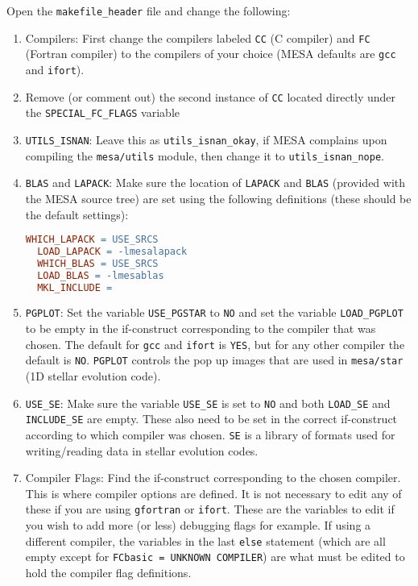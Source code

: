 Open the {\tt makefile\_header} file and change the following:
\begin{enumerate}
\item Compilers: First change the compilers labeled {\tt CC} (C compiler) 
and {\tt FC} (Fortran compiler) to the compilers of your choice ({\sf MESA} 
defaults are {\tt gcc} and {\tt ifort}).

\item Remove (or comment out) the second instance of {\tt CC} located 
directly under the {\tt SPECIAL\_FC\_FLAGS} variable

\item {\tt UTILS\_ISNAN}: Leave this as {\tt utils\_isnan\_okay}, if {\sf MESA} 
complains upon compiling the {\tt mesa/utils} module, then change it to 
{\tt utils\_isnan\_nope}.

\item {\tt BLAS} and {\tt LAPACK}: Make sure the location of {\tt LAPACK} and 
{\tt BLAS} (provided with the {\sf MESA} source tree) are set using the 
following definitions (these should be the default settings):
\begin{lstlisting}[language=make,mathescape=false,upquote=true]
  WHICH_LAPACK = USE_SRCS
  LOAD_LAPACK = -lmesalapack
  WHICH_BLAS = USE_SRCS
  LOAD_BLAS = -lmesablas
  MKL_INCLUDE =
\end{lstlisting}

\item {\tt PGPLOT}: Set the variable {\tt USE\_PGSTAR} to {\tt NO} and set 
the variable {\tt LOAD\_PGPLOT} to be empty in the if-construct corresponding 
to the compiler that was chosen. The default for {\tt gcc} and {\tt ifort} is 
{\tt YES}, but for any other compiler the default is {\tt NO}. {\tt PGPLOT} 
controls the pop up images that are used in {\tt mesa/star} (1D stellar 
evolution code). 

\item {\tt USE\_SE}: Make sure the variable {\tt USE\_SE} is set to {\tt NO} 
and both {\tt LOAD\_SE} and {\tt INCLUDE\_SE} are empty. These also need to 
be set in the correct if-construct according to which compiler was chosen. 
{\tt SE} is a library of 
formats used for writing/reading data in stellar evolution codes.

\item Compiler Flags: Find the if-construct corresponding to the chosen 
compiler. This is where compiler options are defined. It is not necessary to 
edit any of these if you are using {\tt gfortran} or {\tt ifort}. These are 
the variables to edit if you wish to add more (or less) debugging flags 
for example. If using a different compiler, the variables in the last 
{\tt else} statement (which are all empty except for 
{\tt FCbasic = UNKNOWN COMPILER}) are what must be edited to hold the compiler 
flag definitions. 


\end{enumerate}
